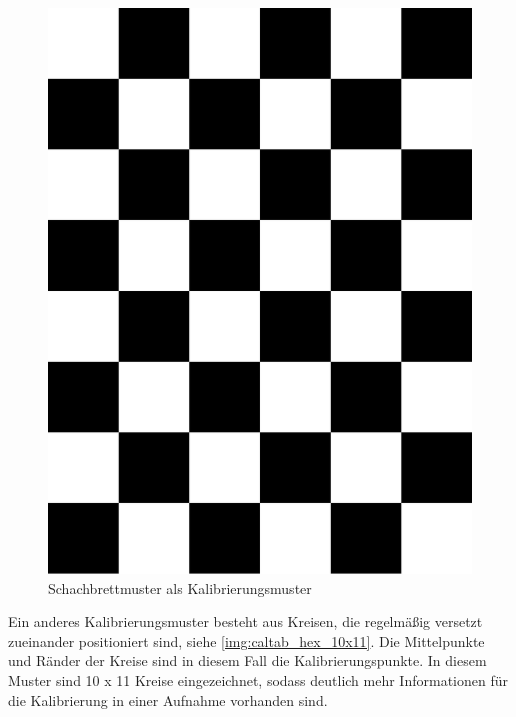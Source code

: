 \begin{figure}[!hbt]
	\centering
	\vspace{1ex}
	\includegraphics[scale=0.3, angle=90]{../images/chess5x7x3}
	\caption[Schachbrettmuster als Kalibrierungsmuster]{\label{img:chess5x7x0.03} Schachbrettmuster als Kalibrierungsmuster}
	\vspace{1ex}
\end{figure}

Ein anderes Kalibrierungsmuster besteht aus Kreisen, die regelmäßig versetzt zueinander positioniert sind, siehe \autoref{img:caltab_hex_10x11}. Die Mittelpunkte und Ränder der Kreise sind in diesem Fall die Kalibrierungspunkte. In diesem Muster sind 10 x 11 Kreise eingezeichnet, sodass deutlich mehr Informationen für die Kalibrierung in einer Aufnahme vorhanden sind. 

